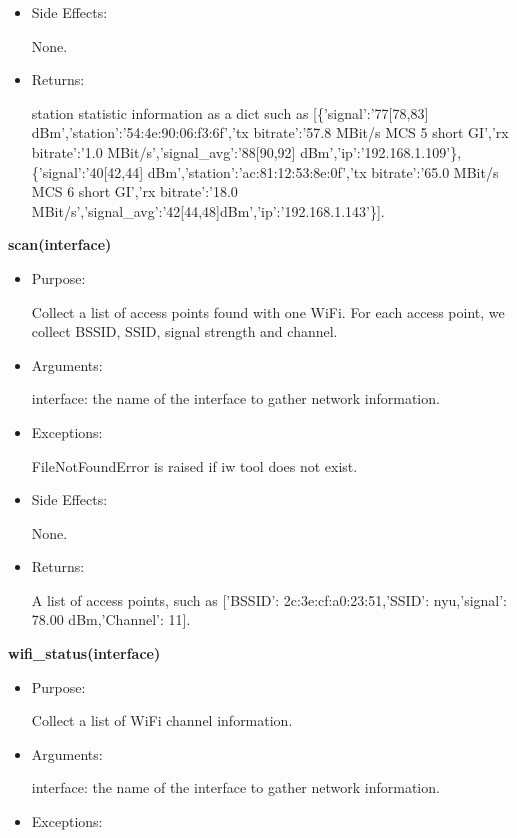 {\begin{itemize}
FileNotFoundError is raised if iw tool does not exist.

\item Side Effects:

None.

\item Returns:

station statistic information as a dict such as [\{'signal':'77[78,83] dBm','station':'54:4e:90:06:f3:6f','tx bitrate':'57.8 MBit/s MCS 5 short GI','rx bitrate':'1.0 MBit/s','signal\_avg':'88[90,92] dBm','ip':'192.168.1.109'\}, \{'signal':'40[42,44] dBm','station':'ac:81:12:53:8e:0f','tx bitrate':'65.0 MBit/s MCS 6 short GI','rx bitrate':'18.0 
MBit/s','signal\_avg':'42[44,48]dBm','ip':'192.168.1.143'\}].
\end{itemize}

\textbf{scan(interface)}
\begin{itemize}
\item Purpose:

Collect a list of access points found with one WiFi. For each access point, we collect BSSID, SSID, signal strength and channel.

\item Arguments:

interface: the name of the interface to gather network information.

\item Exceptions:

FileNotFoundError is raised if iw tool does not exist.

\item Side Effects:

None.

\item Returns:

A list of access points, such as [{'BSSID': 2c:3e:cf:a0:23:51,'SSID': nyu,'signal': 78.00 dBm,'Channel': 11}].
\end{itemize}

\textbf{wifi\_status(interface)}
\begin{itemize}
\item Purpose:

Collect a list of WiFi channel information.

\item Arguments:

interface: the name of the interface to gather network information.

\item Exceptions:


\end{itemize}}
